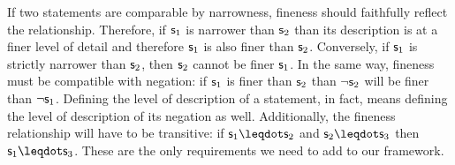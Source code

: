 \documentclass[11pt,letterpaper,fleqn]{memoir} %
\begin{document}
If two statements are comparable by narrowness, fineness should faithfully reflect the relationship. Therefore, if $\mathsf{s}_1$ is narrower than $\mathsf{s}_2$ than its description is at a finer level of detail and therefore $\mathsf{s}_1$ is also finer than $\mathsf{s}_2$. Conversely, if $\mathsf{s}_1$ is strictly narrower than $\mathsf{s}_2$, then $\mathsf{s}_2$ cannot be finer $\mathsf{s}_1$. In the same way, fineness must be compatible with negation: if $\mathsf{s}_1$ is finer than $\mathsf{s}_2$ than $\neg \mathsf{s}_2$ will be finer than $\neg \mathsf{s}_1$. Defining the level of description of a statement, in fact, means defining the level of description of its negation as well. Additionally, the fineness relationship will have to be transitive: if $\stmt_1 \finer \stmt_2$ and $\stmt_2 \finer \stmt_3$ then $\stmt_1 \finer \stmt_3$. These are the only requirements we need to add to our framework.

\end{document}
